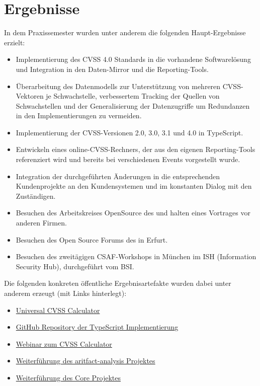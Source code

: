
\chapter{Ergebnisse} \label{ch:ergebnisse}

In dem Praxissemester wurden unter anderem die folgenden Haupt-Ergebnisse erzielt:

\begin{itemize}
    \item Implementierung des CVSS 4.0 Standards in die vorhandene Softwarelösung und Integration in den Daten-Mirror und die Reporting-Tools.
    \item Überarbeitung des Datenmodells zur Unterstützung von mehreren CVSS-Vektoren je Schwachstelle, verbessertem Tracking der Quellen von Schwachstellen und der Generalisierung der Datenzugriffe um Redundanzen in den Implementierungen zu vermeiden.
    \item Implementierung der CVSS-Versionen 2.0, 3.0, 3.1 und 4.0 in TypeScript.
    \item Entwickeln eines online-CVSS-Rechners, der aus den eigenen Reporting-Tools referenziert wird und bereits bei verschiedenen Events vorgestellt wurde.
    \item Integration der durchgeführten Änderungen in die entsprechenden Kundenprojekte an den Kundensystemen und im konstanten Dialog mit den Zuständigen.
    \item Besuchen des Arbeitskreises OpenSource des {\bitkom} und halten eines Vortrages vor anderen Firmen.
    \item Besuchen des Open Source Forums des {\bitkom} in Erfurt.
    \item Besuchen des zweitägigen CSAF-Workshops in München im ISH (Information Security Hub), durchgeführt vom BSI\@.
\end{itemize}

Die folgenden konkreten öffentliche Ergebnisartefakte wurden dabei unter anderem erzeugt (mit Links hinterlegt):

\begin{itemize}[noitemsep]
    \item \href{https://www.metaeffekt.com/security/cvss/calculator}{Universal CVSS Calculator}
    \item \href{https://github.com/org-metaeffekt/metaeffekt-universal-cvss-calculator}{GitHub Repository der TypeScript Implementierung}
    \item \href{https://youtu.be/R2S0_6-NQGQ?si=d7zpxbJ7P4R26nRb&t=2801}{Webinar zum CVSS Calculator}
    \item \href{https://mvnrepository.com/artifact/com.metaeffekt.artifact.analysis/ae-artifact-analysis}{Weiterführung des aritfact-analysis Projektes}
    \item \href{https://github.com/org-metaeffekt/metaeffekt-core}{Weiterführung des Core Projektes}
\end{itemize}
